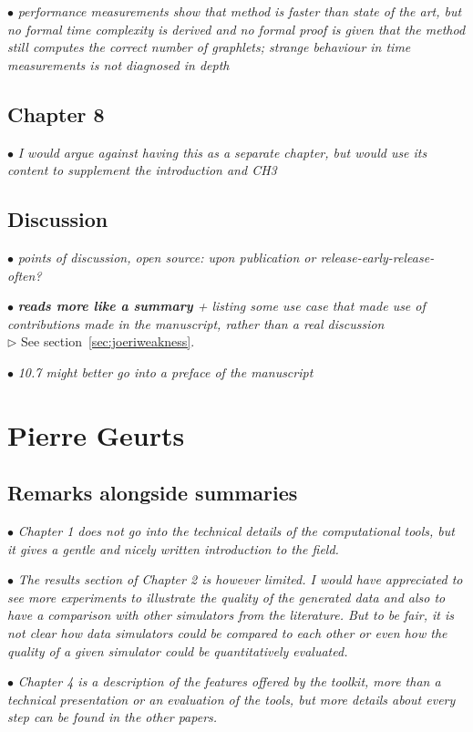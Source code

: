 \documentclass[10pt]{article}
\newcommand{\exam}[2][\  ]{\hspace{0pt}\marginpar{\color{myred}#1}$\bullet$ \textit{#2}}
\newcommand{\imp}[1]{\textbf{#1}}
\newcommand{\answ}[1]{{\color{myblue} $\triangleright$ #1}}
\begin{document}
\exam{performance measurements show that method is faster than state of the art, but no formal time complexity is derived and no formal proof is given that the method still computes the correct number of graphlets; strange behaviour in time measurements is not diagnosed in depth}

\subsection{Chapter 8}

\exam{I would argue against having this as a separate chapter, but would use its content to supplement the introduction and CH3}

\subsection{Discussion}

\exam{points of discussion, open source: upon publication or release-early-release-often?}

\exam{\imp{reads more like a summary} + listing some use case that made use of contributions made in the manuscript, rather than a real discussion} \\
\answ{See section~\ref{sec:joeriweakness}.}

\exam{10.7 might better go into a preface of the manuscript}

\section{Pierre Geurts}

\subsection{Remarks alongside summaries}
\exam{Chapter 1 does not go into the technical details of the computational tools, but it gives a gentle and nicely written introduction to the field.}

\exam{The results
	section of Chapter 2 is however limited. I would have appreciated to see more experiments to illustrate the
	quality of the generated data and also to have a comparison with other simulators from the
	literature. But to be fair, it is not clear how data simulators could be compared to each other or
	even how the quality of a given simulator could be quantitatively evaluated.}

\exam{Chapter 4 is a description of the features offered by the toolkit, more than a technical presentation
	or an evaluation of the tools, but more details about every step can be found in the other papers.}
\end{document}
